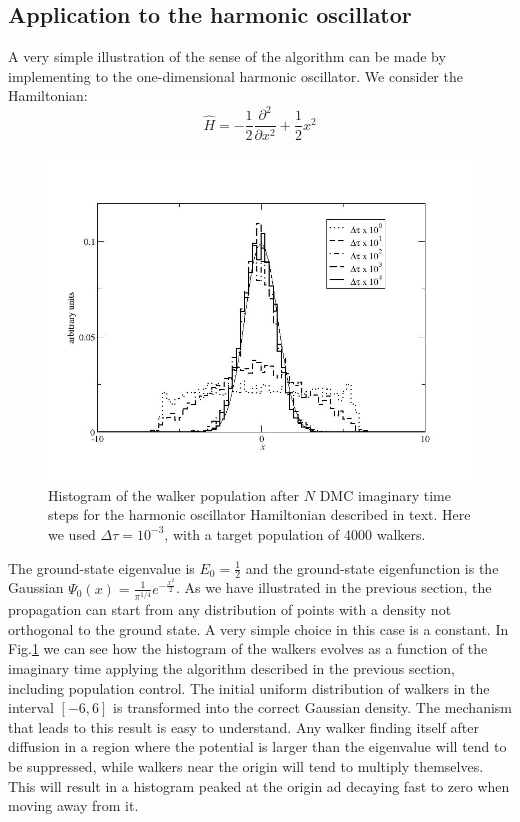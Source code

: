 \subsection{Application to the harmonic oscillator}

A very simple illustration of the sense of the algorithm can be made by implementing to the one-dimensional harmonic oscillator. We consider the Hamiltonian:
\begin{equation}
\hat{H}=-\frac{1}{2}\frac{\partial^2}{\partial x^2}+\frac{1}{2}x^2
\end{equation}
\begin{figure}
	\begin{center}
		\includegraphics[scale=0.5]{Chapter9-figures/hists.jpg}
	\end{center}
	\caption{Histogram of the walker population after $N$ DMC imaginary time steps for the harmonic oscillator Hamiltonian described in text. Here we used $\Delta\tau=10^{-3}$, with a target population of 4000 walkers.}
	\label{fig.hist}
\end{figure}
The ground-state eigenvalue is $E_0=\tfrac{1}{2}$ and the ground-state eigenfunction is the Gaussian $\Psi_0(x)=\frac{1}{\pi^{1/4}}e^{-\frac{x^2}{2}}$. As we have illustrated in the previous section, the propagation can start from any distribution of points with a density not orthogonal to the ground state. A very simple choice in this case is a constant. In Fig.\ref{fig.hist} we can see how the histogram of the walkers evolves as a function of the imaginary time applying the algorithm described in the previous section, including population control. The initial uniform distribution of walkers in the interval $[-6,6]$ is transformed into the correct Gaussian density. The mechanism that leads to this result is easy to understand. Any walker finding itself after diffusion in a region where the potential is larger than the eigenvalue will tend to be suppressed, while walkers near the origin will tend to multiply themselves. This will result in a histogram peaked at the origin ad decaying fast to zero when moving away from it.
